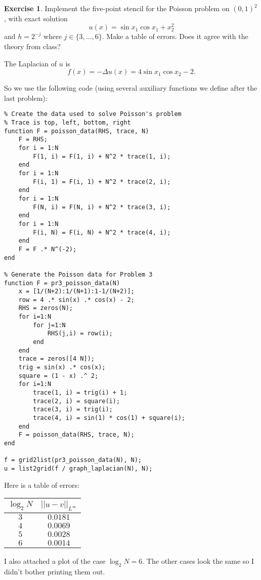 \documentclass[10pt]{article}
\theoremstyle{definition}
\newtheorem{exer}{Exercise}
\begin{document}
\begin{exer}
Implement the five-point stencil for the Poisson problem on $(0, 1)^2$, with exact solution
$$u(x) = \sin x_1 \cos x_1 + x_2^2$$
and $h = 2^{-j}$ where $j \in \{3, \dots, 6\}$. Make a table of errors.
Does it agree with the theory from class?
\end{exer}

The Laplacian of $u$ is
$$f(x) = -\Delta u(x) = 4 \sin x_1 \cos x_2 - 2.$$

So we use the following code (using several auxiliary functions we define after the last problem):
\begin{verbatim}
% Create the data used to solve Poisson's problem
% Trace is top, left, bottom, right
function F = poisson_data(RHS, trace, N)
    F = RHS;
    for i = 1:N
        F(1, i) = F(1, i) + N^2 * trace(1, i);
    end
    for i = 1:N
        F(i, 1) = F(i, 1) + N^2 * trace(2, i);
    end
    for i = 1:N
        F(N, i) = F(N, i) + N^2 * trace(3, i);
    end
    for i = 1:N
        F(i, N) = F(i, N) + N^2 * trace(4, i);
    end
    F = F .* N^(-2);
end

% Generate the Poisson data for Problem 3
function F = pr3_poisson_data(N)
    x = [1/(N+2):1/(N+1):1-1/(N+2)];
    row = 4 .* sin(x) .* cos(x) - 2;
    RHS = zeros(N);
    for i=1:N
        for j=1:N
            RHS(j,i) = row(i);
        end
    end
    trace = zeros([4 N]);
    trig = sin(x) .* cos(x);
    square = (1 - x) .^ 2;
    for i=1:N
        trace(1, i) = trig(i) + 1;
        trace(2, i) = square(i);
        trace(3, i) = trig(i);
        trace(4, i) = sin(1) * cos(1) + square(i);
    end
    F = poisson_data(RHS, trace, N);
end

f = grid2list(pr3_poisson_data(N), N);
u = list2grid(f / graph_laplacian(N), N);
\end{verbatim}

Here is a table of errors:
\begin{center}\begin{tabular}{c | c}
$\log_2 N$ & $||u - v||_{L^\infty}$ \\
\hline
 $3$ & $0.0181$ \\
$4$ & $0.0069$ \\
$5$ & $0.0028$ \\
$6$ & $0.0014$
\end{tabular}\end{center}
I also attached a plot of the case $\log_2 N = 6$.
The other cases look the same so I didn't bother printing them out.
\end{document}
